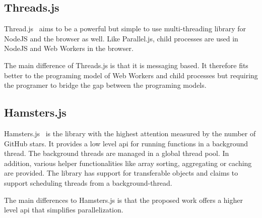 \subsection{Threads.js}
Thread.js~\cite{Wermke2016} aims to be a powerful but simple to use multi-threading library for NodeJS and the browser as well. Like Parallel.js, child processes are used in NodeJS and Web Workers in the browser.

The main difference of Threads.js is that it is messaging based. It therefore fits better to the programing model of Web Workers and child processes but requiring the programer to bridge the gap between the programing models. 

\subsection{Hamsters.js}
Hamsters.js~\cite{hamstersjs} is the library with the highest attention measured by the number of GitHub stars. It provides a low level api for running functions in a background thread. The background threads are managed in a global thread pool. In addition, various helper functionalities like array sorting, aggregating or caching are provided. The library has support for transferable objects and claims to support scheduling threads from a background-thread. 

The main differences to Hamsters.js is that the proposed work offers a higher level api that simplifies parallelization. 